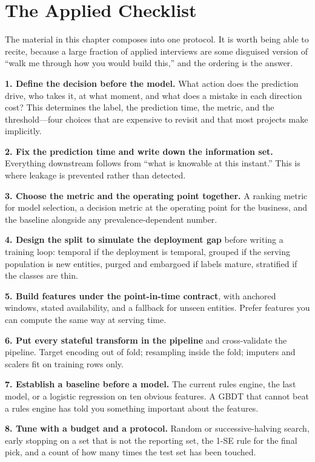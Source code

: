 \section{The Applied Checklist}
\label{cml:sec:applied_checklist}

The material in this chapter composes into one protocol. It is worth being able to recite, because a large fraction of applied interviews are some disguised version of ``walk me through how you would build this,'' and the ordering is the answer.

\textbf{1. Define the decision before the model.} What action does the prediction drive, who takes it, at what moment, and what does a mistake in each direction cost? This determines the label, the prediction time, the metric, and the threshold---four choices that are expensive to revisit and that most projects make implicitly.

\textbf{2. Fix the prediction time and write down the information set.} Everything downstream follows from ``what is knowable at this instant.'' This is where leakage is prevented rather than detected.

\textbf{3. Choose the metric and the operating point together.} A ranking metric for model selection, a decision metric at the operating point for the business, and the baseline alongside any prevalence-dependent number.

\textbf{4. Design the split to simulate the deployment gap} before writing a training loop: temporal if the deployment is temporal, grouped if the serving population is new entities, purged and embargoed if labels mature, stratified if the classes are thin.

\textbf{5. Build features under the point-in-time contract}, with anchored windows, stated availability, and a fallback for unseen entities. Prefer features you can compute the same way at serving time.

\textbf{6. Put every stateful transform in the pipeline} and cross-validate the pipeline. Target encoding out of fold; resampling inside the fold; imputers and scalers fit on training rows only.

\textbf{7. Establish a baseline before a model.} The current rules engine, the last model, or a logistic regression on ten obvious features. A GBDT that cannot beat a rules engine has told you something important about the features.

\textbf{8. Tune with a budget and a protocol.} Random or successive-halving search, early stopping on a set that is not the reporting set, the 1-SE rule for the final pick, and a count of how many times the test set has been touched.

